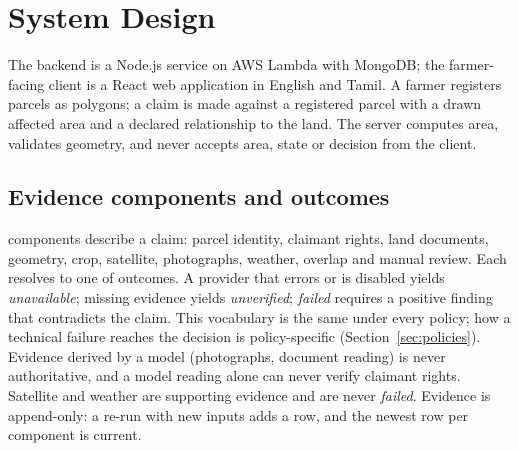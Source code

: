 \documentclass[journal]{IEEEtran}
\begin{document}
\section{System Design}
The backend is a Node.js service on AWS Lambda with MongoDB; the farmer-facing client is a React web application in English and Tamil. A farmer registers parcels as polygons; a claim is made against a registered parcel with a drawn affected area and a declared relationship to the land. The server computes area, validates geometry, and never accepts area, state or decision from the client.

\subsection{Evidence components and outcomes}
\PolicyComponentsCapWord{} components describe a claim: parcel identity, claimant rights, land documents, geometry, crop, satellite, photographs, weather, overlap and manual review. Each resolves to one of \PolicyOutcomesWord{} outcomes. A provider that errors or is disabled yields \emph{unavailable}; missing evidence yields \emph{unverified}; \emph{failed} requires a positive finding that contradicts the claim. This vocabulary is the same under every policy; how a technical failure reaches the decision is policy-specific (Section~\ref{sec:policies}). Evidence derived by a model (photographs, document reading) is never authoritative, and a model reading alone can never verify claimant rights. Satellite and weather are supporting evidence and are never \emph{failed}. Evidence is append-only: a re-run with new inputs adds a row, and the newest row per component is current.
\end{document}
